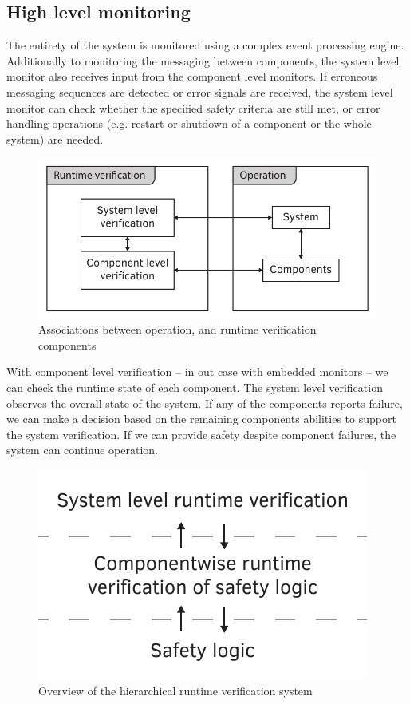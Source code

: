\subsection{High level monitoring}
The entirety of the system is monitored using a complex event processing engine. Additionally to monitoring the messaging between components, the system level monitor also receives input from the component level monitors. If erroneous messaging sequences are detected or error signals are received, the system level monitor can check whether the specified safety criteria are still met, or error handling operations (e.g. restart or shutdown of a component or the whole system) are needed.

\begin{figure}[H]
	\centering
	\includegraphics[width=0.65\linewidth]{include/figures/chapter_1/rv_overview}
	\caption{Associations between operation, and runtime verification components}
	\label{fig:intro:concept_component}
\end{figure}

With component level verification -- in out case with embedded monitors -- we can check the runtime state of each component. The system level verification observes the overall state of the system. If any of the components reports failure, we can make a decision based on the remaining components abilities to support the system verification. If we can provide safety despite component failures, the system can continue operation.

\begin{figure}[h]
	\centering
	\includegraphics[width=0.4\linewidth]{include/figures/chapter_6/overview_1}
	\caption{Overview of the hierarchical runtime verification system}
	\label{fig:case_study:fov}
\end{figure}